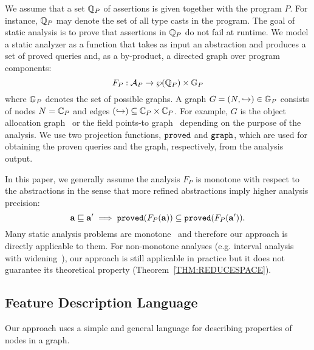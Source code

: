 We assume that a set $\mathbb{Q}_P$ of assertions is given together with the program $P$. For instance, $\mathbb{Q}_P$ may denote the set of all type casts in the program. The goal of static analysis is to prove that assertions in $\mathbb{Q}_P$ do not fail at runtime.
We model a static analyzer as a function that takes as input an abstraction and
produces a set of proved queries and, as a by-product, a directed graph over program components:
\[
F_P: \mathcal{A}_P \to \wp(\mathbb{Q}_P)\times \mathbb{G}_P
\]
where $\mathbb{G}_P$ denotes the set of possible graphs. A graph $G = (N,\hookrightarrow) \in \mathbb{G}_P$ consists of nodes $N = \mathbb{C}_P$ and edges $(\hookrightarrow) \subseteq \mathbb{C}_P \times \mathbb{C}_P$.
For example, $G$ is the object allocation graph~\cite{Li2018b} or the field points-to graph~\cite{Tan2017} depending on the purpose of the analysis.
We use two projection functions, ${\tt proved}$ and
${\tt graph}$, which are used for obtaining the proven queries and the graph, respectively, from the analysis output.

In this paper, we generally assume  the analysis $F_P$ is monotone with respect to the abstractions in the sense that more refined abstractions imply higher analysis precision:
\begin{equation}\label{eq:mono}
{\bf a} \sqsubseteq {\bf a}' \implies {\tt proved}(F_P({\bf a})) \subseteq {{\tt proved}}(F_P({\bf a}')).
\end{equation}
Many static analysis problems are monotone~\cite{JeJeChOh17,Liang2011learning,Liang2011,Zhang2014,Li2018a,Tan2017} and therefore our approach is directly applicable to them. For non-monotone analyses (e.g. interval analysis with widening~\cite{cha2016learning}), our approach is still applicable in practice but it does not guarantee its theoretical property (Theorem~\ref{THM:REDUCESPACE}).

\subsection{Feature Description Language}\label{sec:feat-language}

Our approach uses a simple and general language for describing properties of nodes in a graph.



